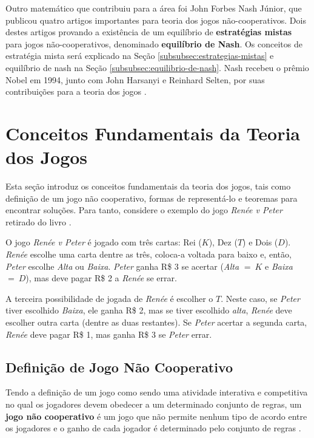 Outro matemático que contribuiu para a área foi John Forbes Nash Júnior, que publicou quatro artigos importantes para teoria dos jogos não-cooperativos. Dois destes artigos provando a existência de um equilíbrio de \textbf{estratégias mistas} para jogos não-cooperativos, denominado \textbf{equilíbrio de Nash}. Os conceitos de estratégia mista será explicado na Seção \ref{subsubsec:estrategias-mistas} e equilíbrio de nash na Seção \ref{subsubsec:equilibrio-de-nash}. Nash recebeu o prêmio Nobel em 1994, junto com John Harsanyi e Reinhard Selten, por suas contribuições para a teoria dos jogos \cite[p.~3--4]{sartini_IIbienaldasbm}.

\section{Conceitos Fundamentais da Teoria dos Jogos}
\label{sec:conceitos-fundamentais-da-teoria-dos-jogos}

Esta seção introduz os conceitos fundamentais da teoria dos jogos, tais como definição de um jogo não cooperativo, formas de representá-lo e teoremas para encontrar soluções. Para tanto, considere o exemplo do jogo \emph{Renée v Peter} retirado do livro \cite{jones_1980}.

\begin{myex}\label{ex:renee-v-peter}
O jogo \emph{Renée v Peter} é jogado com três cartas: Rei ($K$), Dez ($T$) e Dois ($D$). \emph{Renée} escolhe uma carta dentre as três, coloca-a voltada para baixo e, então, \emph{Peter} escolhe \emph{Alta} ou \emph{Baixa}. \emph{Peter} ganha R\$ 3 se acertar (\emph{Alta} $=\ K$ e \emph{Baixa} $=\ D$), mas deve pagar R\$ 2 a \emph{Renée} se errar.

A terceira possibilidade de jogada de \emph{Renée} é escolher o $T$. Neste caso, se \emph{Peter} tiver escolhido \emph{Baixa}, ele ganha R\$ 2, mas se tiver escolhido \emph{alta}, \emph{Renée} deve escolher outra carta (dentre as duas restantes). Se \emph{Peter} acertar a segunda carta, \emph{Renée} deve pagar R\$ 1, mas ganha R\$ 3 se \emph{Peter} errar.
\end{myex}

\subsection{Definição de Jogo Não Cooperativo}
\label{subsec:definicao-de-jogo-nao-cooperativo}

Tendo a definição de um jogo como sendo uma atividade interativa e competitiva no qual os jogadores devem obedecer a um determinado conjunto de regras, um \textbf{jogo não cooperativo} é um jogo que não permite nenhum tipo de acordo entre os jogadores e o ganho de cada jogador é determinado pelo conjunto de regras \cite{jones_1980}.

